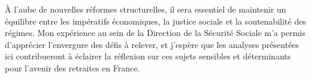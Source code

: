 À l’aube de nouvelles réformes structurelles, il sera essentiel de maintenir un équilibre entre les impératifs économiques, la justice sociale et la soutenabilité des régimes. Mon expérience au sein de la Direction de la Sécurité Sociale m’a permis d’apprécier l’envergure des défis à relever, et j’espère que les analyses présentées ici contribueront à éclairer la réflexion sur ces sujets sensibles et déterminants pour l’avenir des retraites en France.